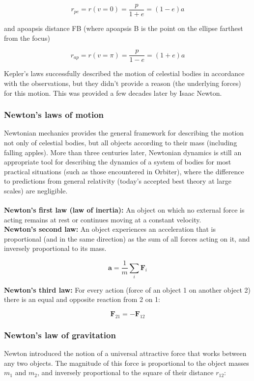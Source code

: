 \documentclass[Orbiter User Manual.tex]{subfiles}
\begin{document}
\[ r_{pe} = r(v=0) = \frac{p}{1 + e} = (1 - e) a \]

\noindent
and apoapsis distance FB (where apoapsis B is the point on the ellipse farthest from the focus)

\[ r_{ap} = r(v=\pi) = \frac{p}{1 - e} = (1 + e) a \]

\noindent
Kepler's laws successfully described the motion of celestial bodies in accordance with the observations, but they didn't provide a reason (the underlying forces) for this motion. This was provided a few decades later by Isaac Newton.

\subsubsection{Newton's laws of motion}
Newtonian mechanics provides the general framework for describing the motion not only of celestial bodies, but all objects according to their mass (including falling apples). More than three centuries later, Newtonian dynamics is still an appropriate tool for describing the dynamics of a system of bodies for most practical situations (such as those encountered in Orbiter), where the difference to predictions from general relativity (today's accepted best theory at large scales) are negligible.\\
\\
\textbf{Newton's first law (law of inertia):} An object on which no external force is acting remains at rest or continues moving at a constant velocity.\\
\textbf{Newton's second law:} An object experiences an acceleration that is proportional (and in the same direction) as the sum of all forces acting on it, and inversely proportional to its mass.

\[ \textbf{a} = \frac{1}{m} \sum_{i} \textbf{F}_{i} \]

\noindent
\textbf{Newton's third law:} For every action (force of an object 1 on another object 2) there is an equal and opposite reaction from 2 on 1:

\[ \textbf{F}_{21} = - \textbf{F}_{12} \]

\subsubsection{Newton's law of gravitation}
Newton introduced the notion of a universal attractive force that works between any two objects. The magnitude of this force is proportional to the object masses $m_{1}$ and $m_{2}$, and inversely proportional to the square of their distance $r_{12}$:
\end{document}
